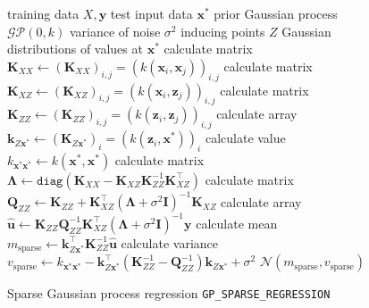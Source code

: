 \begin{figure}[!t]
    \begin{algorithm}[H]
      \caption{Sparse Gaussian process regression \texttt{GP\_SPARSE\_REGRESSION}}
      \label{alg:gp_sparse_regression}
      \begin{algorithmic}
      \Input training data $X,\bm{y}$ 
      \Input test input data $\bm{x}^{\ast}$
      \Input prior Gaussian process $\mathcal{GP}(0,k)$ 
      \Input variance of noise $\sigma^{2}$
      \Input inducing points $Z$ 
      \Output Gaussian distributions of values at $\bm{x}^{\ast}$
      \State calculate matrix $\bm{K}_{XX}\gets(\bm{K}_{XX})_{i,j}=(k(\bm{x}_{i},\bm{x}_{j}))_{i,j}$
      \State calculate matrix $\bm{K}_{XZ}\gets(\bm{K}_{XZ})_{i,j}=(k(\bm{x}_{i},\bm{z}_{j}))_{i,j}$
      \State calculate matrix $\bm{K}_{ZZ}\gets(\bm{K}_{ZZ})_{i,j}=(k(\bm{z}_{i},\bm{z}_{j}))_{i,j}$
      \State calculate array $\bm{k}_{Z\bm{x}^{\ast}}\gets(\bm{K}_{Z\bm{x}^{\ast}})_{i}=(k(\bm{z}_{i},\bm{x}^{\ast}))_{i}$
      \State calculate value $k_{\bm{x}^{\ast}\bm{x}^{\ast}}\gets k(\bm{x}^{\ast},\bm{x}^{\ast})$
      \State calculate matrix $\bm{\Lambda}\gets\texttt{diag}(\bm{K}_{XX}-\bm{K}_{XZ}\bm{K}_{ZZ}^{-1}\bm{K}_{XZ}^{\top})$ 
      \State calculate matrix $\bm{Q}_{ZZ}\gets\bm{K}_{ZZ}+\bm{K}_{XZ}^{\top}(\bm{\Lambda}+\sigma^{2}\bm{I})^{-1}\bm{K}_{XZ}$
      \State calculate array $\hat{\bm{u}}\gets\bm{K}_{ZZ}\bm{Q}_{ZZ}^{-1}\bm{K}_{XZ}^{\top}(\bm{\Lambda}+\sigma^{2}\bm{I})^{-1}\bm{y}$
      \State calculate mean $m_{\textrm{sparse}}\gets\bm{k}_{Z\bm{x}^{\ast}}^{\top}\bm{K}_{ZZ}^{-1}\hat{\bm{u}}$
      \State calculate variance $v_{\textrm{sparse}}\gets k_{\bm{x}^{\ast}\bm{x}^{\ast}}-\bm{k}_{Z\bm{x}^{\ast}}^{\top}(\bm{K}_{ZZ}^{-1}-\bm{Q}_{ZZ}^{-1})\bm{k}_{Z\bm{x}^{\ast}}+\sigma^{2}$
      \State \Return $\mathcal{N}(m_{\textrm{sparse}},v_{\textrm{sparse}})$
      \EndFunction
      \end{algorithmic}
    \end{algorithm}
  \end{figure}